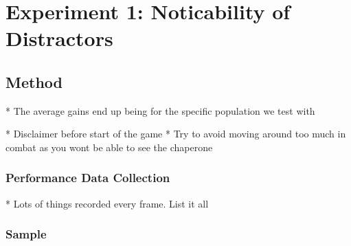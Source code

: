 \chapter{Experiment 1: Noticability of Distractors}\label{chap:ex1}

\section{Method}
* The average gains end up being for the specific population we test with

* Disclaimer before start of the game
   * Try to avoid moving around too much in combat as you wont be able to see the chaperone

\subsection{Performance Data Collection}
* Lots of things recorded every frame. List it all

\subsection{Sample}